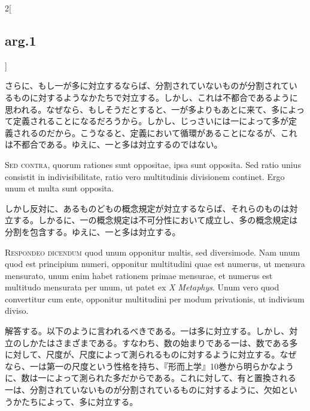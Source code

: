 \documentclass[paper=a4paper,fontsize=10pt,jafontsize=9pt,titlepage]{jlreq}
\begin{document}
\begin{paracol}{2}[\subsection{arg.1}]
\switchcolumn

さらに、もし一が多に対立するならば、分割されていないものが分割されてい
るものに対するようなかたちで対立する。しかし、これは不都合であるように
思われる。なぜなら、もしそうだとすると、一が多よりもあとに来て、多によっ
て定義されることになるだろうから。しかし、じっさいには一によって多が定
義されるのだから。こうなると、定義において循環があることになるが、これ
は不都合である。ゆえに、一と多は対立するのではない。

\switchcolumn*[\subsection{s.c.}]

{\scshape Sed contra}, quorum rationes sunt oppositae, ipsa sunt opposita. Sed
ratio unius consistit in indivisibilitate, ratio vero multitudinis
divisionem continet. Ergo unum et multa sunt opposita.

\switchcolumn

しかし反対に、あるものどもの概念規定が対立するならば、それらのものは対
立する。しかるに、一の概念規定は不可分性において成立し、多の概念規定は
分割を包含する。ゆえに、一と多は対立する。


{\scshape Respondeo dicendum} quod unum opponitur multis, sed diversimode. Nam unum
quod est principium numeri, opponitur multitudini quae est numerus, ut
mensura mensurato, unum enim habet rationem primae mensurae, et numerus
est multitudo mensurata per unum, ut patet ex {\itshape X Metaphys}. Unum vero quod
convertitur cum ente, opponitur multitudini per modum privationis, ut
indivisum diviso.

\switchcolumn

解答する。以下のように言われるべきである。一は多に対立する。しかし、対
立のしかたはさまざまである。すなわち、数の始まりである一は、数である多
に対して、尺度が、尺度によって測られるものに対するように対立する。なぜ
なら、一は第一の尺度という性格を持ち、『形而上学』10巻から明らかなよう
に、数は一によって測られた多だからである。これに対して、有と置換される
一は、分割されていないものが分割されているものに対するように、欠如とい
うかたちによって、多に対立する。

\switchcolumn*[\subsection{ad.1}]


\end{paracol}
\end{document}

